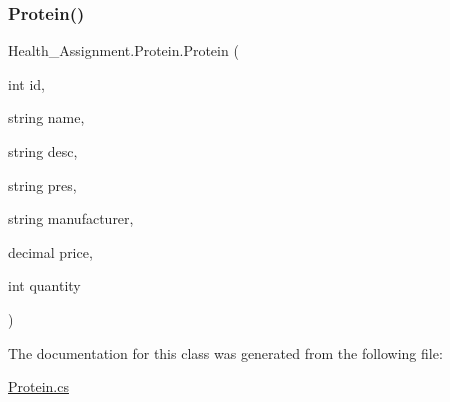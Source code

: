 \subsubsection{\texorpdfstring{Protein()}{Protein()}\hspace{0.1cm}{\footnotesize\ttfamily [3/3]}}
{\footnotesize\ttfamily Health\+\_\+\+Assignment.\+Protein.\+Protein (\begin{DoxyParamCaption}\item[{int}]{id,  }\item[{string}]{name,  }\item[{string}]{desc,  }\item[{string}]{pres,  }\item[{string}]{manufacturer,  }\item[{decimal}]{price,  }\item[{int}]{quantity }\end{DoxyParamCaption})\hspace{0.3cm}{\ttfamily [inline]}}



The documentation for this class was generated from the following file\+:\begin{DoxyCompactItemize}
\item 
\hyperlink{_protein_8cs}{Protein.\+cs}\end{DoxyCompactItemize}
